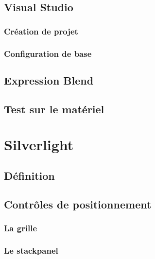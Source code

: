 \documentclass[twoside,UTF8]{EPURapport}
\begin{document}
	\section{Visual Studio}
		\subsection{Création de projet}
		
		\subsection{Configuration de base}
		
	\section{Expression Blend}
	
	\section{Test sur le matériel}



\chapter{Silverlight}

	\section{Définition}
	
	
	\section{Contrôles de positionnement}
		\subsection{La grille}
		\subsection{Le stackpanel}
\end{document}
